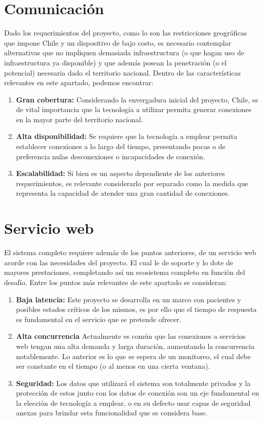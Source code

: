 \newpage
\section{Comunicación}
Dado los requerimientos del proyecto, como lo son las restricciones geográficas que impone Chile y un dispositivo de bajo costo, es necesario contemplar alternativas que no impliquen demasiada infraestructura (o que hagan uso de infraestructura ya disponible) y que además posean la penetración (o el potencial) necesaria dado el territorio nacional. Dentro de las características relevantes en este apartado, podemos encontrar:

\begin{enumerate}
	\item \textbf{Gran cobertura:}
	Considerando la envergadura inicial del proyecto, Chile, es de vital importancia que la tecnología a utilizar permita generar conexiones en la mayor parte del territorio nacional.
	\item \textbf{Alta disponibilidad:}
	Se requiere que la tecnología a emplear permita establecer conexiones a lo largo del tiempo, presentando pocas o de preferencia nulas desconexiones o incapacidades de conexión.
	\item \textbf{Escalabilidad:}
	Si bien es un aspecto dependiente de los anteriores requerimientos, es relevante considerarlo por separado como la medida que representa la capacidad de atender una gran cantidad de conexiones.
\end{enumerate}

\newpage
\section{Servicio web}
El sistema completo requiere además de los puntos anteriores, de un servicio web acorde con las necesidades del proyecto. El cual le de soporte y lo dote de mayores prestaciones, completando así un ecosistema completo en función del desafío. Entre los puntos más relevantes de este apartado se consideran:

\begin{enumerate}
	\item \textbf{Baja latencia:}
	Este proyecto se desarrolla en un marco con pacientes y posibles estados críticos de los mismos, es por ello que el tiempo de respuesta es fundamental en el servicio que se pretende ofrecer.
	\item \textbf{Alta concurrencia}
	Actualmente es común que las conexiones a servicios web tengan una alta demanda y larga duración, aumentando la concurrencia notablemente. Lo anterior es lo que se espera de un monitoreo, el cual debe ser constante en el tiempo (o al menos en una cierta ventana).
	\item \textbf{Seguridad:}
	Los datos que utilizará el sistema son totalmente privados y la protección de estos junto con los datos de conexión son un eje fundamental en la elección de tecnología a emplear, o en su defecto usar capas de seguridad anexas para brindar esta funcionalidad que se considera base.
\end{enumerate}